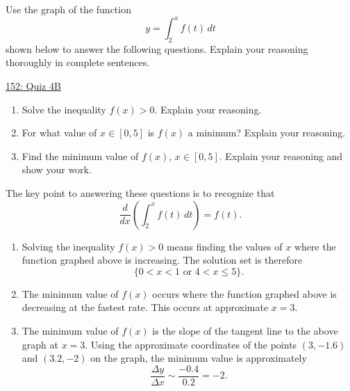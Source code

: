 \documentclass{ximera}
\begin{document}
\begin{question} \label{QLDFefe555441}

Use the graph of the function
\[
  y = \int_2^x f(t)\, dt
\]
shown below to answer the following questions. Explain your reasoning thoroughly in complete sentences.


\begin{onlineOnly}
    \begin{center}
\end{center}
\end{onlineOnly}

\href{https://www.desmos.com/calculator/zoyrvkqbv8}{152: Quiz 4B}

\begin{enumerate}

\item Solve the inequality $f(x)>0$. Explain your reasoning.

\item For what value of $x\in[0,5]$ is $f(x)$ a minimum? Explain your reasoning.

\item Find the minimum value of $f(x)$, $x\in [0,5]$. Explain your reasoning and show your work.
\end{enumerate}


\begin{explanation}

The key point to answering these questions is to recognize that
\[
 \frac{d}{dx} \left(   \int_2^x f(t)\, dt \right) = f(t).
\]

\begin{enumerate}
\item Solving the inequality $f(x)>0$ means finding the values of $x$ where the function graphed above is increasing. The solution set is therefore
\[
  \{ 0 < x <1 \text{ or } 4 < x \leq 5 \}.
\] 

\item The minimum value of $f(x)$ occurs where the function graphed above is decreasing at the fastest rate. This occurs at approximate $x=3$.

\item The minimum value of $f(x)$ is the slope of the tangent line to the above graph at $x=3$. Using the approximate coordinates of the points $(3,-1.6)$ and $(3.2, -2)$ on the graph, the minimum value is approximately
\[
 \frac{\Delta y}{\Delta x} \sim \frac{-0.4}{0.2} = -2.
\]  

\end{enumerate}



\end{explanation}
\end{question}
\end{document}
